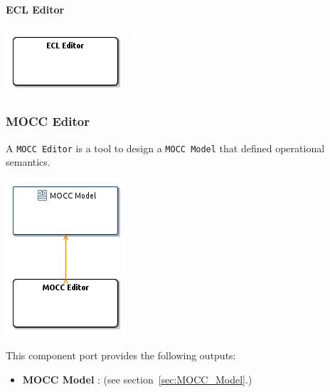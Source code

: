 \documentclass{gemoc} %
\begin{document}
\paragraph{ECL Editor}
\label{sec:ECL_Editor}


\begin{center}
\includegraphics*[trim=0.0cm 0.0cm 0cm 0.0cm, clip=true]{../images/generated/Generated_ECL_Editor.png}
\end{center}





\subsubsection{MOCC Editor}
\label{sec:MOCC_Editor}
A \texttt{MOCC Editor} is a tool to design a \texttt{MOCC Model} that defined operational semantics.
\begin{center}
\includegraphics*[trim=0.0cm 0.0cm 0cm 0.0cm, clip=true]{../images/generated/Generated_MOCC_Editor.png}
\end{center}


This component port provides the following outputs:
\begin{itemize}
  \item \textbf{MOCC Model} :
(see section~\ref{sec:MOCC_Model}.)
\end{itemize}
\end{document}

